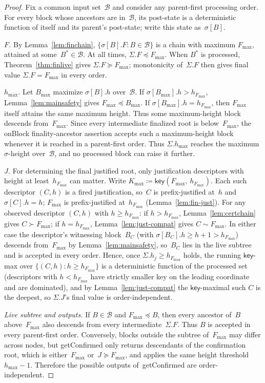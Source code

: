 \ifx\litemode\undefined\documentclass{article}\fi
\newcommand{\hmax}{\ensuremath{h_{\max}}\xspace}
\newcommand{\onBlock}{\textsf{onBlock}\xspace}
\newcommand{\getConfirmed}{\textsf{getConfirmed}\xspace}
\newcommand{\key}{\ensuremath{\mathsf{key}}}
\theoremstyle{plain}
\theoremstyle{definition}
\theoremstyle{remark}
\begin{document}
\begin{proof}
Fix a common input set~$\mathcal B$ and consider any parent-first processing order.
For every block whose ancestors are in~$\mathcal B$, its post-state is a deterministic function of itself and its parent's post-state; write this state as~$\sigma[B]$.

\emph{$F$.} By Lemma~\ref{lem:finchain}, $\{\sigma[B].F : B \in \mathcal B\}$ is a chain with maximum $F_{\max}$, attained at some~$B^\ast \in \mathcal B$.
At all times, $\Sigma.F \preceq F_{\max}$.
When $B^\ast$ is processed, Theorem~\ref{thm:finlive} gives $\Sigma.F \succeq F_{\max}$; monotonicity of~$\Sigma.F$ then gives final value $\Sigma.F=F_{\max}$ in every order.

\emph{$\hmax$.} Let $B_{\max}$ maximize $\sigma[B].h$ over~$\mathcal B$.
If $\sigma[B_{\max}].h > h_{F_{\max}}$, Lemma~\ref{lem:mainsafety} gives $F_{\max} \preceq B_{\max}$.
If $\sigma[B_{\max}].h = h_{F_{\max}}$, then $F_{\max}$ itself attains the same maximum height.
Thus some maximum-height block descends from~$F_{\max}$.
Since every intermediate finalized root is below~$F_{\max}$, the \onBlock finality-ancestor assertion accepts such a maximum-height block whenever it is reached in a parent-first order.
Thus $\Sigma.\hmax$ reaches the maximum $\sigma$-height over~$\mathcal B$, and no processed block can raise it further.

\emph{$J$.} For determining the final justified root, only justification descriptors with height at least~$h_{F_{\max}}$ can matter.
Write $K_{\max} \coloneqq \key(F_{\max},\, h_{F_{\max}})$.
Each such descriptor $(C, h)$ is a fired justification, so~$C$ is prefix-justified at~$h$ and $\sigma[C].h = h$; $F_{\max}$ is prefix-justified at~$h_{F_{\max}}$ (Lemma~\ref{lem:fin-just}).
For any observed descriptor $(C, h)$ with $h \geq h_{F_{\max}}$: if $h > h_{F_{\max}}$, Lemma~\ref{lem:certchain} gives $C \succ F_{\max}$; if $h = h_{F_{\max}}$, Lemma~\ref{lem:just-compat} gives $C \sim F_{\max}$.
In either case the descriptor's witnessing block~$B_C$ (with $\sigma[B_C].h \geq h + 1 > h_{F_{\max}}$) descends from~$F_{\max}$ by Lemma~\ref{lem:mainsafety}, so~$B_C$ lies in the live subtree and is accepted in every order.
Hence, once $\Sigma.h_j \geq h_{F_{\max}}$ holds, the running \key-max over $\{(C,h) : h \geq h_{F_{\max}}\}$ is a deterministic function of the processed set (descriptors with $h < h_{F_{\max}}$ have strictly smaller key on the leading coordinate and are dominated), and by Lemma~\ref{lem:just-compat} the \key-maximal such $C$ is the deepest, so $\Sigma.J$'s final value is order-independent.

\emph{Live subtree and outputs.} If $B \in \mathcal B$ and $F_{\max} \preceq B$, then every ancestor of~$B$ above~$F_{\max}$ also descends from every intermediate~$\Sigma.F$.
Thus $B$ is accepted in every parent-first order.
Conversely, blocks outside the subtree of~$F_{\max}$ may differ across nodes, but \getConfirmed only returns descendants of the confirmation root, which is either~$F_{\max}$ or~$J \succeq F_{\max}$, and applies the same height threshold~$\hmax-1$.
Therefore the possible outputs of~\getConfirmed are order-independent.
\end{proof}
\end{document}
